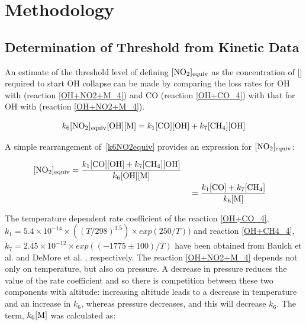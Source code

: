 \section{Methodology}

\subsection{Determination of Threshold \texorpdfstring{}{NOx} from Kinetic Data}
\label{4.2.1}
An estimate of the threshold level of  defining $[\ce{NO2}]_{\mathrm{equiv}}$ as the concentration of [] required to start OH collapse can be made by comparing the loss rates for OH with  (reaction \eqref{OH+NO2+M_4}) and CO (reaction \eqref{OH+CO_4}) with that for OH with  (reaction \eqref{OH+NO2+M_4}).

\begin{equation}
	 k_{6} [\ce{NO2}]_{\mathrm{equiv}} [\ce{OH}] [\ce{M}] = k_{1} [\ce{CO}] [\ce{OH}] + k_{7} [\ce{CH4}] [\ce{OH}]
\label{k6NO2equiv}
\end{equation}

A simple rearrangement of~\eqref{k6NO2equiv} provides an expression for $[\ce{NO2}]_{\mathrm{equiv}}$:

\begin{align}
\begin{split}
    [\ce{NO2}]_{\mathrm{equiv}} {}&= \frac{k_{1} [\ce{CO}] [\ce{OH}] + k_7 [\ce{CH4}] [\ce{OH}]}{k_6 [\ce{OH}] [\ce{M}]} \nonumber
\end{split} \\
    {}&= \frac{k_1 [\ce{CO}] + k_7 [\ce{CH4}]}{k_6 [\ce{M}]}
    \label{no2equiv}
\end{align}

The temperature dependent rate coefficient of the reaction \eqref{OH+CO_4}, $k_1 = 5.4 \times 10^{-14} \times ((T/298)^{1.5}) \times exp (250/T))$ and reaction \eqref{OH+CH4_4}, $k_7 = 2.45 \times 10^{-12} \times exp \left (\left (-1775 \pm 100 \right )/ T \right )$ have been obtained from Baulch et al. \cite{Baulch1992} and DeMore et al. \cite{DeMore1997}, respectively. The reaction \eqref{OH+NO2+M_4} depends not only on temperature, but also on pressure. A decrease in pressure reduces the value of the rate coefficient and so there is competition between these two components with altitude: increasing altitude leads to a decrease in temperature and an increase in $k_6$, whereas pressure decreases, and this will decrease $k_6$. The term, $k_6 [\ce{M}]$ was calculated as:

